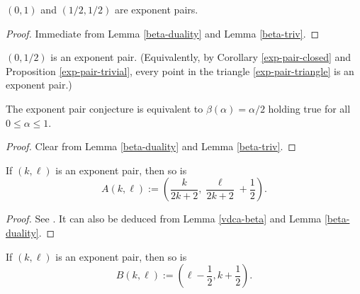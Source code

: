 \begin{proposition}\label{exp-pair-trivial}  $(0,1)$ and $(1/2,1/2)$ are exponent pairs.
\end{proposition}

\begin{proof} Immediate from Lemma \ref{beta-duality} and Lemma \ref{beta-triv}.
\end{proof}

\begin{conjecture}\label{exp-pair-conj}  $(0,1/2)$ is an exponent pair.  (Equivalently, by Corollary \ref{exp-pair-closed} and Proposition \ref{exp-pair-trivial}, every point in the triangle \eqref{exp-pair-triangle} is an exponent pair.)
\end{conjecture}



\begin{lemma}\label{exp-pair-conj-beta}  The exponent pair conjecture is equivalent to $\beta(\alpha)=\alpha/2$ holding true for all $0 \leq \alpha \leq 1$.
\end{lemma}

\begin{proof} Clear from Lemma \ref{beta-duality} and Lemma \ref{beta-triv}.
\end{proof}

\begin{proposition}\label{vdc-a}  If $(k,\ell)$ is an exponent pair, then so is
    $$A(k,\ell) := \left(\frac{k}{2k+2}, \frac{\ell}{2k+2} + \frac{1}{2}\right).$$
\end{proposition}

\literature
{}

\begin{proof} See \cite[Lemma 2.8]{ivic}. It can also be deduced from Lemma \ref{vdca-beta} and Lemma \ref{beta-duality}.
\end{proof}

\begin{proposition}\label{vdc-b}  If $(k,\ell)$ is an exponent pair, then so is
    $$B(k,\ell) := \left(\ell-\frac{1}{2}, k+\frac{1}{2}\right).$$
\end{proposition}

